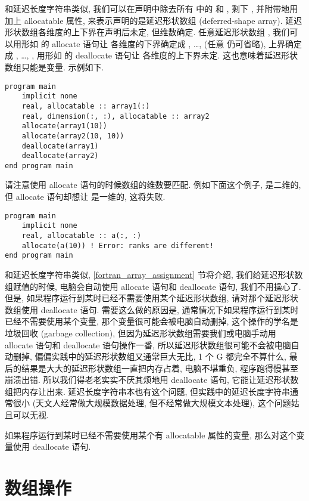和延迟长度字符串类似, 我们可以在声明中除去所有  中的  和 , 剩下 \ttt{:}, 并附带地用  加上 allocatable 属性, 来表示声明的是延迟形状数组 (deferred-shape array). 延迟形状数组各维度的上下界在声明后未定, 但维数确定. 任意延迟形状数组 , 我们可以用形如  的 allocate 语句让  各维度的下界确定成 , \dots,  (任意  仍可省略), 上界确定成 , \dots, , 用形如  的 deallocate 语句让  各维度的上下界未定. 这也意味着延迟形状数组只能是变量. 示例如下.
\begin{lstlisting}
program main
    implicit none
    real, allocatable :: array1(:)
    real, dimension(:, :), allocatable :: array2
    allocate(array1(10))
    allocate(array2(10, 10))
    deallocate(array1)
    deallocate(array2)
end program main
\end{lstlisting}
请注意使用 allocate 语句的时候数组的维数要匹配. 例如下面这个例子,  是二维的, 但 allocate 语句却想让  是一维的, 这将失败.
\begin{lstlisting}
program main
    implicit none    
    real, allocatable :: a(:, :)
    allocate(a(10)) ! Error: ranks are different!
end program main
\end{lstlisting}

和延迟长度字符串类似, \ref{fortran_array_assignment} 节将介绍, 我们给延迟形状数组赋值的时候, 电脑会自动使用 allocate 语句和 deallocate 语句, 我们不用操心了. 但是, 如果程序运行到某时已经不需要使用某个延迟形状数组, 请对那个延迟形状数组使用 deallocate 语句. 需要这么做的原因是, 通常情况下如果程序运行到某时已经不需要使用某个变量, 那个变量很可能会被电脑自动删掉, 这个操作的学名是垃圾回收 (garbage collection), 但因为延迟形状数组需要我们或电脑手动用 allocate 语句和 deallocate 语句操作一番, 所以延迟形状数组很可能不会被电脑自动删掉, 偏偏实践中的延迟形状数组又通常巨大无比, 1 个 G 都完全不算什么, 最后的结果是大大的延迟形状数组一直把内存占着, 电脑不堪重负, 程序跑得慢甚至崩溃出错. 所以我们得老老实实不厌其烦地用 deallocate 语句, 它能让延迟形状数组把内存让出来. 延迟长度字符串本也有这个问题, 但实践中的延迟长度字符串通常很小 (天文人经常做大规模数据处理, 但不经常做大规模文本处理), 这个问题姑且可以无视.
\begin{convention}
    如果程序运行到某时已经不需要使用某个有 allocatable 属性的变量, 那么对这个变量使用 deallocate 语句.
\end{convention}

\section{数组操作}\label{fortran_array_manipulation}

